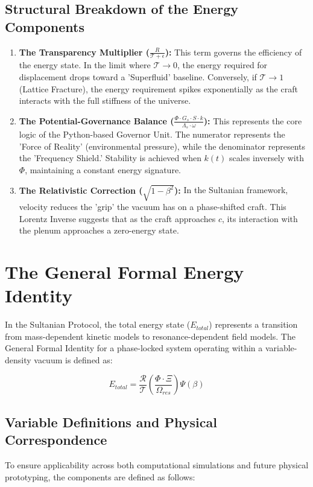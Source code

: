 \documentclass[11pt]{article}
\begin{document}
\subsection{Structural Breakdown of the Energy Components}

\begin{enumerate}
    \item \textbf{The Transparency Multiplier ($\frac{R}{\mathcal{T} + \epsilon}$):} 
    This term governs the efficiency of the energy state. In the limit where $\mathcal{T} \to 0$, the energy required for displacement drops toward a 'Superfluid' baseline. Conversely, if $\mathcal{T} \to 1$ (Lattice Fracture), the energy requirement spikes exponentially as the craft interacts with the full stiffness of the universe.
    
    \item \textbf{The Potential-Governance Balance ($\frac{\Phi \cdot G_s \cdot S \cdot k}{\Lambda_s \cdot \omega}$):} 
    This represents the core logic of the Python-based Governor Unit. The numerator represents the 'Force of Reality' (environmental pressure), while the denominator represents the 'Frequency Shield.' Stability is achieved when $k(t)$ scales inversely with $\Phi$, maintaining a constant energy signature.
    
    \item \textbf{The Relativistic Correction ($\sqrt{1 - \beta^2}$):} 
    In the Sultanian framework, velocity reduces the 'grip' the vacuum has on a phase-shifted craft. This Lorentz Inverse suggests that as the craft approaches $c$, its interaction with the plenum approaches a zero-energy state.
\end{enumerate}

\section{The General Formal Energy Identity}

In the Sultanian Protocol, the total energy state ($E_{total}$) represents a transition from mass-dependent kinetic models to resonance-dependent field models. The General Formal Identity for a phase-locked system operating within a variable-density vacuum is defined as:

\begin{equation}
    E_{total} = \frac{\mathcal{R}}{\mathcal{T}} \left( \frac{\Phi \cdot \Xi}{\Omega_{res}} \right) \Psi(\beta)
\end{equation}

\subsection{Variable Definitions and Physical Correspondence}
To ensure applicability across both computational simulations and future physical prototyping, the components are defined as follows:
\end{document}
